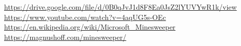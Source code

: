\documentclass{article}
\begin{document}
\begin{thebibliography}{9}

\url{https://drive.google.com/file/d/0B0qJvJ1d8F8Ea0JsZ2lYUVYwR1k/view}
\url{https://www.youtube.com/watch?v=4aqUG5s-OEc}
\url{https://en.wikipedia.org/wiki/Microsoft_Minesweeper}
\url{https://magnushoff.com/minesweeper/}

\end{thebibliography}
\end{document}
